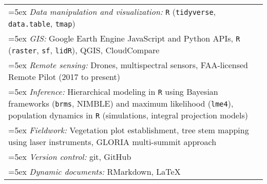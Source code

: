\begin{longtable}{@{}>{\raggedright}p{5.25in} >{\raggedleft}X@{}}

\hangindent=5ex \emph{Data manipulation and visualization:} \texttt{R} (\texttt{tidyverse}, \texttt{data.table}, \texttt{tmap}) & \tabularnewline
\hangindent=5ex \emph{GIS:} Google Earth Engine JavaScript and Python APIs, \texttt{R} (\texttt{raster}, \texttt{sf}, \texttt{lidR}), QGIS, CloudCompare & \tabularnewline
\hangindent=5ex \emph{Remote sensing:} Drones, multispectral sensors, FAA-licensed Remote Pilot (2017 to present) & \tabularnewline
\hangindent=5ex \emph{Inference:} Hierarchical modeling in \texttt{R} using Bayesian frameworks (\texttt{brms}, NIMBLE) and maximum likelihood (\texttt{lme4}), population dynamics in \texttt{R} (simulations, integral projection models) & \tabularnewline
\hangindent=5ex \emph{Fieldwork:} Vegetation plot establishment, tree stem mapping using laser instruments, GLORIA multi-summit approach & \tabularnewline
\hangindent=5ex \emph{Version control:} git, GitHub & \tabularnewline
\hangindent=5ex \emph{Dynamic documents:} RMarkdown, \LaTeX{} & \tabularnewline

\end{longtable}